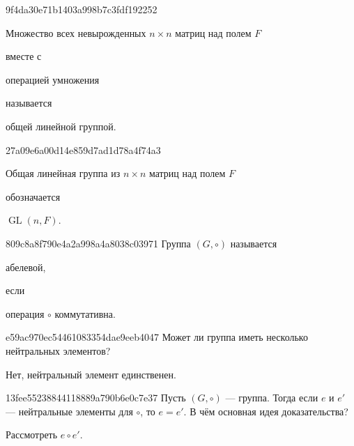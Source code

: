 \begin{note}{9f4da30e71b1403a998b7c3fdf192252}
    \begin{icloze}{2}Множество всех невырожденных \({ n \times n }\) матриц над полем \({ F }\)\end{icloze} вместе с \begin{icloze}{3}операцией умножения\end{icloze} называется \begin{icloze}{1}общей линейной группой.\end{icloze}
\end{note}

\begin{note}{27a09e6a00d14e859d7ad1d78a4f74a3}
    \begin{icloze}{2}Общая линейная группа из \({ n \times n }\) матриц над полем \({ F }\)\end{icloze} обозначается \begin{icloze}{1}\({ \operatorname{GL}(n, F) }\).\end{icloze}
\end{note}

\begin{note}{809c8a8f790e4a2a998a4a8038c03971}
    Группа \({ (G, \circ) }\) называется \begin{icloze}{2}абелевой,\end{icloze} если \begin{icloze}{1}операция \({ \circ }\) коммутативна.\end{icloze}
\end{note}

\begin{note}{e59ac970ec54461083354dae9eeb4047}
    Может ли группа иметь несколько нейтральных элементов?

    \begin{cloze}{1}
        Нет, нейтральный элемент единственен.
    \end{cloze}
\end{note}

\begin{note}{13fee55238844118889a790b6e0c7e37}
    Пусть \({ (G, \circ) }\) --- группа.
    Тогда если \({ e }\) и \({ e' }\) --- нейтральные элементы для \({ \circ }\), то \({ e = e' }\). В чём основная идея доказательства?

    \begin{cloze}{1}
        Рассмотреть \({ e \circ e' }\).
    \end{cloze}
\end{note}

